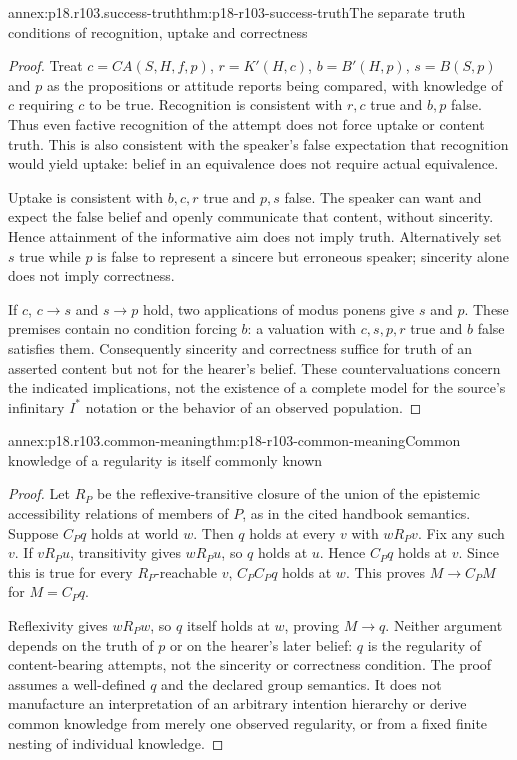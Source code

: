 \begin{annexitem}{annex:p18.r103.success-truth}{thm:p18-r103-success-truth}{The separate truth conditions of recognition, uptake and correctness}
\begin{proof}
Treat \(c=CA(S,H,f,p)\), \(r=K'(H,c)\),
\(b=B'(H,p)\), \(s=B(S,p)\) and \(p\) as the propositions
or attitude reports being compared, with knowledge of \(c\) requiring
\(c\) to be true. Recognition is consistent with \(r,c\) true
and \(b,p\) false. Thus even factive recognition of the attempt
does not force uptake or content truth. This is also consistent with
the speaker's false expectation that recognition would yield uptake:
belief in an equivalence does not require actual equivalence.

Uptake is consistent with \(b,c,r\) true and \(p,s\) false.
The speaker can want and expect the false belief and openly communicate
that content, without sincerity. Hence attainment of the informative
aim does not imply truth. Alternatively set \(s\) true while \(p\)
is false to represent a sincere but erroneous speaker; sincerity alone
does not imply correctness.

If \(c\), \(c\to s\) and \(s\to p\) hold, two applications
of modus ponens give \(s\) and \(p\). These premises contain no
condition forcing \(b\): a valuation with \(c,s,p,r\) true and
\(b\) false satisfies them. Consequently sincerity and correctness
suffice for truth of an asserted content but not for the hearer's belief.
These countervaluations concern the indicated implications, not the
existence of a complete model for the source's infinitary \(I^*\)
notation or the behavior of an observed population.
\end{proof}
\end{annexitem}

\begin{annexitem}{annex:p18.r103.common-meaning}{thm:p18-r103-common-meaning}{Common knowledge of a regularity is itself commonly known}
\begin{proof}
Let \(R_P\) be the reflexive-transitive closure of the union of
the epistemic accessibility relations of members of \(P\), as in
the cited handbook semantics. Suppose \(C_Pq\) holds at world
\(w\). Then \(q\) holds at every \(v\) with \(wR_Pv\).
Fix any such \(v\). If \(vR_Pu\), transitivity gives
\(wR_Pu\), so \(q\) holds at \(u\). Hence \(C_Pq\)
holds at \(v\). Since this is true for every \(R_P\)-reachable
\(v\), \(C_PC_Pq\) holds at \(w\). This proves
\(M\to C_PM\) for \(M=C_Pq\).

Reflexivity gives \(wR_Pw\), so \(q\) itself holds at \(w\),
proving \(M\to q\). Neither argument depends on the truth of
\(p\) or on the hearer's later belief: \(q\) is the regularity
of content-bearing attempts, not the sincerity or correctness condition.
The proof assumes a well-defined \(q\) and the declared group
semantics. It does not manufacture an interpretation of an arbitrary
intention hierarchy or derive common knowledge from merely one observed
regularity, or from a fixed finite nesting of individual knowledge.
\end{proof}
\end{annexitem}

